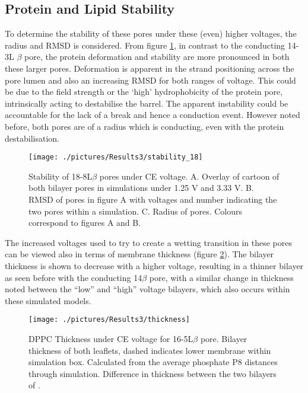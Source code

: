 \subsection*{Protein and Lipid Stability}

To determine the stability of these pores under these (even) higher voltages, the radius and RMSD is considered. From figure \ref{fig:stability_18}, in contrast to the conducting 14-3L $\beta$ pore, the protein deformation and stability are more pronounced in both these larger pores.  Deformation is apparent in the strand positioning across the pore lumen and also an increasing RMSD for both ranges of voltage. This could be due to the field strength or the `high' hydrophobicity of the protein pore, intrinsically acting to destabilise the barrel. The apparent instability could be accountable for the lack of a break and hence a conduction event. However noted before, both pores are of a radius which is conducting, even with the protein destabilisation. 

\begin{figure}[H]
\begin{center}
\texttt{[image: ./pictures/Results3/stability\_18]}
\caption[Stability of 18-8L$\beta$ pores under CE voltage.] {Stability of 18-8L$\beta$ pores under CE voltage. A. Overlay of cartoon of both bilayer pores in simulations under 1.25 V and 3.33 V. B. RMSD of pores in figure A with voltages and number indicating the two pores within a simulation. C. Radius of pores. Colours correspond to figures A and B.}
\label{fig:stability_18}
\end{center}
\end{figure}

The increased voltages used to try to create a wetting transition in these pores can be viewed also in terms of membrane thickness (figure \ref{fig:thickness}). The bilayer thickness is shown to decrease with a higher voltage, resulting in a thinner bilayer as seen before with the conducting 14$\beta$ pore, with a similar change in thickness noted between the ``low'' and ``high'' voltage bilayers, which also occurs within these simulated models. 

\begin{figure}[H]
\begin{center}
\texttt{[image: ./pictures/Results3/thickness]}
\caption[DPPC Thickness under CE voltage for 16-5L$\beta$ pore.] {DPPC Thickness under CE voltage for 16-5L$\beta$ pore. Bilayer thickness of both leaflets, dashed indicates lower membrane within simulation box. Calculated from the average phosphate P8 distances through simulation. Difference in thickness between the two bilayers of  \angstrom.}
\label{fig:thickness}
\end{center}
\end{figure}

